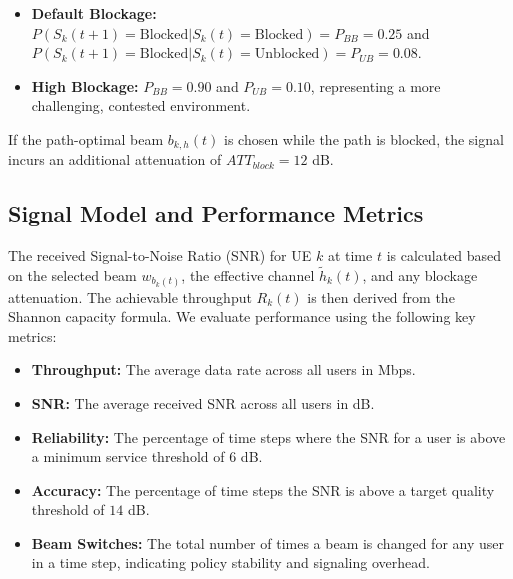 \begin{itemize}
    \item \textbf{Default Blockage:} $P(S_{k}(t+1)=\text{Blocked}|S_{k}(t)=\text{Blocked}) = P_{BB} = 0.25$ and $P(S_{k}(t+1)=\text{Blocked}|S_{k}(t)=\text{Unblocked}) = P_{UB} = 0.08$.
    \item \textbf{High Blockage:} $P_{BB} = 0.90$ and $P_{UB} = 0.10$, representing a more challenging, contested environment.
\end{itemize}

If the path-optimal beam $b_{k,h}(t)$ is chosen while the path is blocked, the signal incurs an additional attenuation of $ATT_{block} = 12$ dB.

\subsection{Signal Model and Performance Metrics}

\label{subsec:Signal_Model}

The received Signal-to-Noise Ratio (SNR) for UE $k$ at time $t$ is calculated based on the selected beam $w_{b_k(t)}$, the effective channel $\tilde{h}_k(t)$, and any blockage attenuation. The achievable throughput $R_k(t)$ is then derived from the Shannon capacity formula. We evaluate performance using the following key metrics:

\begin{itemize}
    \item \textbf{Throughput:} The average data rate across all users in Mbps.
    \item \textbf{SNR:} The average received SNR across all users in dB.
    \item \textbf{Reliability:} The percentage of time steps where the SNR for a user is above a minimum service threshold of $6$ dB.
    \item \textbf{Accuracy:} The percentage of time steps the SNR is above a target quality threshold of $14$ dB.
    \item \textbf{Beam Switches:} The total number of times a beam is changed for any user in a time step, indicating policy stability and signaling overhead.
\end{itemize}

